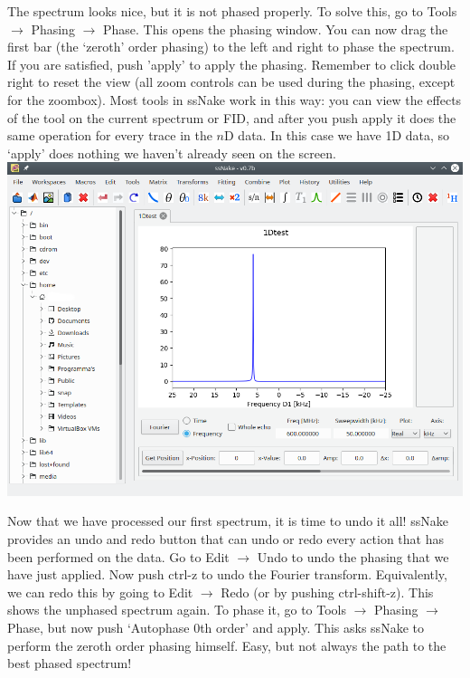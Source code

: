 \documentclass[11pt,a4paper]{article}
\begin{document}
The spectrum looks nice, but it is not phased properly. To solve this, go to Tools $\rightarrow$
Phasing $\rightarrow$ Phase. This opens the phasing window. You can now drag the first bar (the `zeroth' order phasing)
to the left and right to phase the spectrum. If you are satisfied, push 'apply' to apply the
phasing. Remember to click double right to reset the view (all zoom controls can be used during the
phasing, except for the zoombox). Most tools in ssNake work in this way: you can view the effects of
the tool on the current spectrum or FID, and after you push apply it does the same operation for
every trace in the $n$D data. In this case we have 1D data, so `apply' does nothing we haven't
already seen on the screen. \\ \includegraphics[width=\linewidth]{Images/1DspecPhased.png}

Now that we have processed our first spectrum, it is time to undo it all! ssNake provides an undo and redo button that can undo or redo every action that has been performed on the data. Go to Edit $\rightarrow$ Undo to undo the phasing that we have just applied. Now push ctrl-z to undo the Fourier transform. Equivalently, we can redo this by going to Edit $\rightarrow$ Redo (or by pushing ctrl-shift-z). This shows the unphased spectrum again. To phase it, go to Tools $\rightarrow$ Phasing $\rightarrow$ Phase, but now push `Autophase 0th order' and apply. This asks ssNake to perform the zeroth order phasing himself. Easy, but not always the path to the best phased spectrum! 
\end{document}
